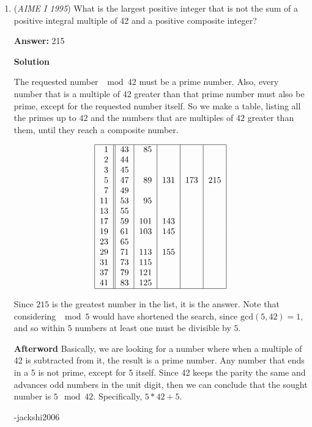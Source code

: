 \begin{enumerate}
 


	\item (\textit{AIME I 1995}) What is the largest positive integer that is not the sum of a positive integral multiple of 42 and a positive composite integer?


 
 \textbf{Answer: }215



\textbf{Solution}

The requested number $\mod {42}$ must be a prime number. Also, every number that is a multiple of $42$ greater than that prime number must also be prime, except for the requested number itself. So we make a table, listing all the primes up to $42$ and the numbers that are multiples of $42$ greater than them, until they reach a composite number.

 
 \[\begin{tabular}{|r||r|r|r|r|r|} \hline 1 & 43 & 85&&& \\ 2&44&&&& \\ 3&45&&&& \\ 5&47&89&131&173&215 \\ 7&49&&&& \\ 11&53&95&&& \\ 13&55&&&& \\ 17&59&101&143&& \\ 19&61&103&145&& \\ 23&65&&&& \\ 29&71&113&155&& \\ 31&73&115&&& \\ 37&79&121&&& \\  41&83&125&&& \\ \hline \end{tabular}\]

 Since $\boxed{215}$ is the greatest number in the list, it is the answer. Note that considering $\mod {5}$ would have shortened the search, since $\text{gcd}(5,42)=1$, and so within $5$ numbers at least one must be divisible by $5$.

 \textbf{Afterword} Basically, we are looking for a number where when a multiple of 42 is subtracted from it, the result is a prime number. Any number that ends in a 5 is not prime, except for 5 itself. Since 42 keeps the parity the same and advances odd numbers in the unit digit, then we can conclude that the sought number is $5 \mod 42$. Specifically, $5 * 42 + 5$.

 -jackshi2006

 




\end{enumerate}
